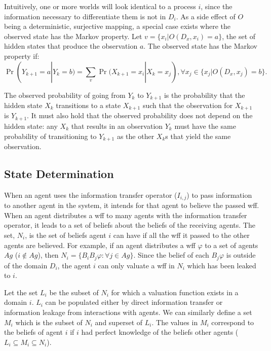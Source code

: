 Intuitively, one or more worlds will look identical to a process $i$, since the information necessary to differentiate them is not in $D_i$.
As a side effect of $O$ being a deterministic, surjective mapping, a special case exists where the observed state has the Markov property.
Let $v=\{x_i | O(D_x, x_i) = a\}$, the set of hidden states that produce the observation $a$.
The observed state has the Markov property if:
\begin{equation}
    \Pr(Y_{k+1}=a | Y_{k}=b) = \sum_{v} \Pr(X_{k+1}=x_i | X_{k}=x_j), \forall x_j \in \{x_j | O(D_x, x_j) = b\}.
\label{eq:hidden-to-chain}
\end{equation}

The observed probability of going from $Y_k$ to $Y_{k+1}$ is the probability that the hidden state $X_k$ transitions to a state $X_{k+1}$ such that the observation for $X_{k+1}$ is $Y_{k+1}$.
It must also hold that the observed probability does not depend on the hidden state: any $X_k$ that results in an observation $Y_k$ must have the same probability of transitioning to $Y_{k+1}$ as the other $X_{k}$s that yield the same observation.

\subsection{State Determination}

When an agent uses the information transfer operator ($I_{i,j}$) to pass information to another agent in the system, it intends for that agent to believe the passed wff.
When an agent distributes a wff to many agents with the information transfer operator, it leads to a set of beliefs about the beliefs of the receiving agents.
The set, $N_i$, is the set of beliefs agent $i$ can have if all the wff it passed to the other agents are believed.
For example, if an agent distributes a wff $\varphi$ to a set of agents $Ag$ ($i \not \in Ag$), then $N_i = \{ B_i B_j \varphi : \forall j \in Ag \}$.
Since the belief of each $B_j \varphi$ is outside of the domain $D_i$, the agent $i$ can only valuate a wff in $N_i$ which has been leaked to $i$.

Let the set $L_i$ be the subset of $N_i$ for which a valuation function exists in a domain $i$.
$L_i$ can be populated either by direct information transfer or information leakage from interactions with agents.
We can similarly define a set $M_i$ which is the subset of $N_i$ and superset of $L_i$.
The values in $M_i$ correspond to the beliefs of agent $i$ if $i$ had perfect knowledge of the beliefs other agents ($L_i \subseteq M_i \subseteq N_i$).

